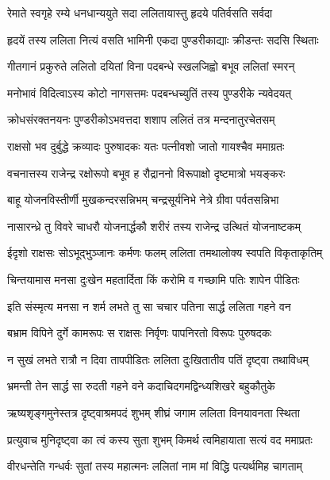 \twolineshloka
{रेमाते स्वगृहे रम्ये धनधान्ययुते सदा}
{ललितायास्तु हृदये पतिर्वसति सर्वदा} %

\twolineshloka
{हृदयें तस्य ललिता नित्यं वसति भामिनी}
{एकदा पुण्डरीकाद्याः क्रीडन्तः सदसि स्थिताः} %

\twolineshloka
{गीतगानं प्रकुरुते ललितो दयितां विना}
{पदबन्धे स्खलजिह्वो बभूव ललितां स्मरन्} %

\twolineshloka
{मनोभावं विदित्वाऽस्य कोटो नागसत्तमः}
{पदबन्धच्युतिं तस्य पुण्डरीके न्यवेदयत्} %

\twolineshloka
{क्रोधसंरक्तनयनः पुण्डरीकोऽभवत्तदा}
{शशाप ललितं तत्र मन्दनातुरचेतसम्} %

\twolineshloka
{राक्षसो भव दुर्बुद्धे क्रव्यादः पुरुषादकः}
{यतः पत्नीवशो जातो गायश्चैव ममाग्रतः} %

\twolineshloka
{वचनात्तस्य राजेन्द्र रक्षोरूपो बभूव ह}
{रौद्राननो विरूपाक्षो दृष्टमात्रो भयङ्करः} %

\twolineshloka
{बाहू योजनविस्तीर्णी मुखकन्दरसन्निभम्}
{चन्द्रसूर्यनिभे नेत्रे ग्रीवा पर्वतसन्निभा} %

\twolineshloka
{नासारन्ध्रे तु विवरे चाधरौ योजनार्द्धकौ}
{शरीरं तस्य राजेन्द्र उत्थितं योजनाष्टकम्} %

\twolineshloka
{ईदृशो राक्षसः सोऽभूद्भुञ्जानः कर्मणः फलम्}
{ललिता तमथालोक्य स्वपति विकृताकृतिम्} %

\twolineshloka
{चिन्तयामास मनसा दुःखेन महतार्दिता}
{किं करोमि व गच्छामि पतिः शापेन पीडितः} %

\twolineshloka
{इति संस्मृत्य मनसा न शर्म लभते तु सा}
{चचार पतिना सार्द्ध ललिता गहने वन} %

\twolineshloka
{बभ्राम विपिने दुर्गे कामरूपः स राक्षसः}
{निर्वृणः पापनिरतो विरूपः पुरुषदकः} %

\twolineshloka
{न सुखं लभते रात्रौ न दिवा तापपीडितः}
{ललिता दुःखितातीव पतिं दृष्ट्वा तथाविधम्} %

\twolineshloka
{भ्रमन्ती तेन सार्द्ध सा रुदती गहने वने}
{कदाचिदगमद्विन्ध्यशिखरे बहुकौतुके} %

\twolineshloka
{ऋष्यशृङ्गमुनेस्तत्र दृष्ट्वाश्रमपदं शुभम्}
{शीघ्रं जगाम ललिता विनयावनता स्थिता} %

\twolineshloka
{प्रत्युवाच मुनिदृष्ट्वा का त्वं कस्य सुता शुभम्}
{किमर्थ त्वमिहायाता सत्यं वद ममाप्रतः} %


\twolineshloka
{वीरधन्तेति गन्धर्वः सुतां तस्य महात्मनः}
{ललितां नाम मां विद्धि पत्यर्थमिह चागताम्} %

